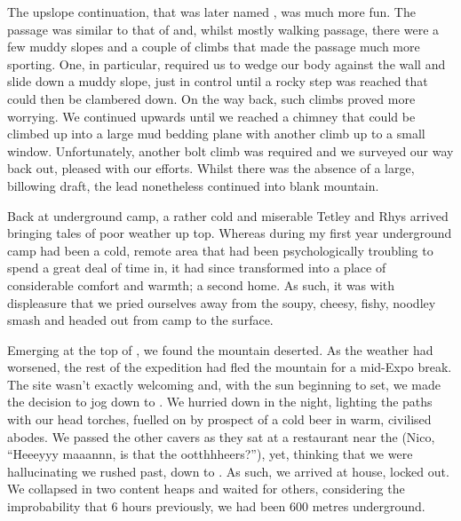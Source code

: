 The upslope continuation, that was later named , was
much more fun. The passage was similar to that of  and, whilst
mostly walking passage, there were a few muddy slopes and a couple of
climbs that made the passage much more sporting. One, in particular,
required us to wedge our body against the wall and slide down a muddy
slope, just in control until a rocky step was reached that could then be
clambered down. On the way back, such climbs proved more worrying. We
continued upwards until we reached a chimney that could be climbed up
into a large mud bedding plane with another climb up to a small window.
Unfortunately, another bolt climb was required and we surveyed our way
back out, pleased with our efforts. Whilst there was the absence of a
large, billowing draft, the lead nonetheless continued into blank
mountain.



Back at underground camp, a rather cold and miserable Tetley and Rhys
arrived bringing tales of poor weather up top. Whereas during my first
year underground camp had been a cold, remote area that had been
psychologically troubling to spend a great deal of time in, it had since
transformed into a place of considerable comfort and warmth; a second
home. As such, it was with displeasure that we pried ourselves away from
the soupy, cheesy, fishy, noodley smash and headed out from camp
 to the surface.





Emerging at the top of , we found the mountain deserted. As the
weather had worsened, the rest of the expedition had fled the mountain
for a mid-Expo break. The site wasn't exactly welcoming and, with the
sun beginning to set, we made the decision to jog down to . We
hurried down in the night, lighting the paths with our head torches,
fuelled on by prospect of a cold beer in warm, civilised abodes. We
passed the other cavers as they sat at a restaurant near the  (Nico, ``Heeeyyy maaannn, is that the ootthhheers?''), yet,
thinking that we were hallucinating we rushed past, down to . As
such, we arrived at  house, locked out. We collapsed in two
content heaps and waited for others, considering the improbability that
6 hours previously, we had been 600 metres underground.

